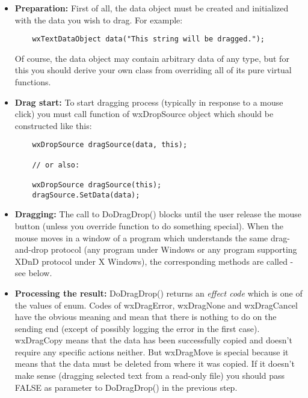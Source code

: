 \begin{itemize}\itemsep=0pt
\item {\bf Preparation:} First of all, the data object must be created and
initialized with the data you wish to drag. For example:

\begin{verbatim}
	wxTextDataObject data("This string will be dragged.");
\end{verbatim}

Of course, the data object may contain arbitrary data of any type, but for
this you should derive your own class from  overriding all of its pure virtual
functions.

\item{\bf Drag start:} To start dragging process (typically in response to a
mouse click) you must call  function
of wxDropSource object which should be constructed like this:

\begin{verbatim}
	wxDropSource dragSource(data, this);

	// or also:

	wxDropSource dragSource(this);
	dragSource.SetData(data);
\end{verbatim}

\item {\bf Dragging:} The call to DoDragDrop() blocks until the user release the
mouse button (unless you override  function
to do something special). When the mouse moves in a window of a program which understands the
same drag-and-drop protocol (any program under Windows or any program supporting XDnD protocol
under X Windows), the corresponding  methods
are called - see below.

\item {\bf Processing the result:} DoDragDrop() returns an {\it effect code} which
is one of the values of  enum. Codes
of wxDragError, wxDragNone and wxDragCancel have the obvious meaning and mean
that there is nothing to do on the sending end (except of possibly logging the
error in the first case). wxDragCopy means that the data has been successfully
copied and doesn't require any specific actions neither. But wxDragMove is
special because it means that the data must be deleted from where it was
copied. If it doesn't make sense (dragging selected text from a read-only
file) you should pass FALSE as parameter to DoDragDrop() in the previous step.
\end{itemize}


